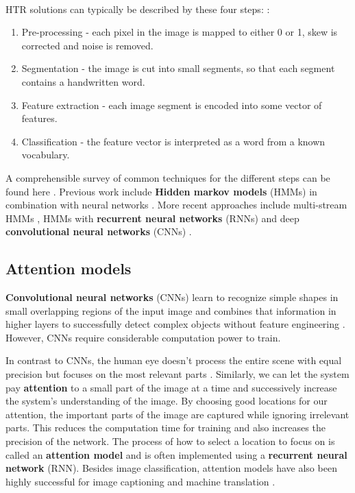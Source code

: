 \paragraph{}
HTR solutions can typically be described by these four steps: \cite{offline_HWR_CNN}:
\begin{enumerate}
    \item Pre-processing - each pixel in the image is mapped to either 0 or 1, skew is corrected and noise is removed.
    \item Segmentation - the image is cut into small segments, so that each segment contains a handwritten word.
    \item Feature extraction - each image segment is encoded into some vector of features.
    \item Classification - the feature vector is interpreted as a word from a known vocabulary.
\end{enumerate}

A comprehensible survey of common techniques for the different steps can be found here \cite{HWR_survey}.
Previous work include \textbf{Hidden markov models} (HMMs) in combination with neural networks \cite{Offline_HWR_HMM_ANN}.
More recent approaches include multi-stream HMMs \cite{HWR_multi_stream_HMM_arabic}, HMMs with \textbf{recurrent neural networks} (RNNs) \cite{Offline_HWR_RNN} and deep \textbf{convolutional neural networks} (CNNs) \cite{offline_HWR_CNN}.


\subsection{Attention models}


\textbf{Convolutional neural networks} (CNNs) learn to recognize simple shapes in small overlapping regions of the input image and combines that information in higher layers to successfully detect complex objects without feature engineering \cite{DeepMindAttention}.
However, CNNs require considerable computation power to train.

In contrast to CNNs, the human eye doesn't process the entire scene with equal precision but focuses on the most relevant parts \cite{DeepMindAttention}.
Similarly, we can let the system pay \textbf{attention} to a small part of the image at a time and successively increase the system's understanding of the image.
By choosing good locations for our attention, the important parts of the image are captured while ignoring irrelevant parts.
This reduces the computation time for training and also increases the precision of the network. The process of how to select a location to focus on is called an \textbf{attention model} and is often implemented using a \textbf{recurrent neural network} (RNN). Besides image classification, attention models have also been highly successful for image captioning \cite{AttendAndTell} and machine translation \cite{machine_translation_attention}.


